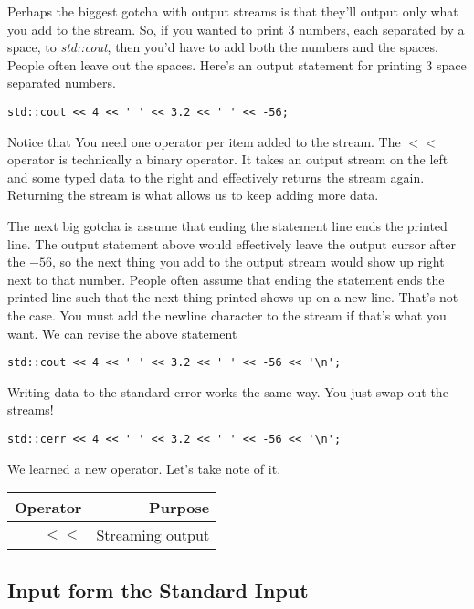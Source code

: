 \documentclass[]{tufte-handout}
\begin{document}
Perhaps the biggest gotcha with output streams is that they'll output only what you add to the stream. So, if you wanted to print 3 numbers, each separated by a space, to \textit{std::cout}, then you'd have to add both the numbers and the spaces. People often leave out the spaces.  Here's an output statement for printing 3 space separated numbers.
\begin{verbatim}
std::cout << 4 << ' ' << 3.2 << ' ' << -56;
\end{verbatim}
Notice that You need one operator per item added to the stream. The $<<$ operator is technically a binary operator. It takes an output stream on the left and some typed data to the right and effectively returns the stream again. Returning the stream is what allows us to keep adding more data. 

The next big gotcha is assume that ending the statement line ends the printed line. The output statement above would effectively leave the output cursor after the $-56$, so the next thing you add to the output stream would show up right next to that number. People often assume that ending the statement ends the printed line such that the next thing printed shows up on a new line.  That's not the case. You must add the newline character to the stream if that's what you want. We can revise the above statement 
\begin{verbatim}
std::cout << 4 << ' ' << 3.2 << ' ' << -56 << '\n';
\end{verbatim}

Writing data to the standard error works the same way. You just swap out the streams!
\begin{verbatim}
std::cerr << 4 << ' ' << 3.2 << ' ' << -56 << '\n';
\end{verbatim}

We learned a new operator. Let's take note of it.
\begin{center}
\begin{tabular}{rr}
Operator & Purpose \\ \hline
$<<$ & Streaming output 
\end{tabular}
\end{center}

\subsection{Input form the Standard Input}
\end{document}
